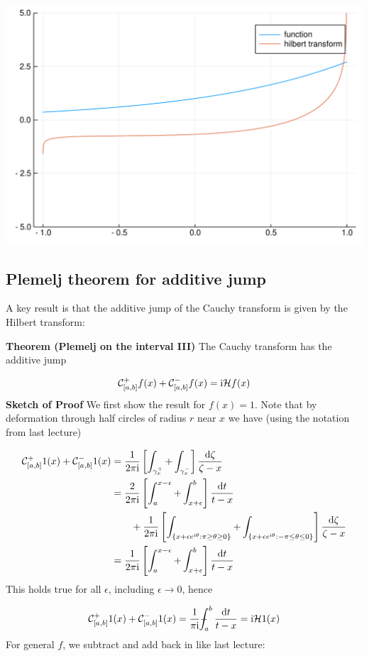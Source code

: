 \documentclass[12pt,a4paper]{article}
\def\D{ {\rm d} }
\def\I{ {\rm i} }
\def\CC{ {\cal C} }
\def\HH{ {\cal H} }
\def\Xint#1{ \mathchoice
   {\XXint\displaystyle\textstyle{#1} }%
   {\XXint\textstyle\scriptstyle{#1} }%
   {\XXint\scriptstyle\scriptscriptstyle{#1} }%
   {\XXint\scriptscriptstyle\scriptscriptstyle{#1} }%
   \!\int}
\def\XXint#1#2#3{ {\setbox0=\hbox{$#1{#2#3}{\int}$}
     \vcenter{\hbox{$#2#3$}}\kern-.5\wd0} }
\def\dashint{\Xint-}
\def\dt{\D t}
\begin{document}
\includegraphics[width=\linewidth]{figures/Lecture14_4_1.pdf}

\subsection{Plemelj theorem for additive jump}
A key result is that the additive jump of the Cauchy transform is given by the Hilbert transform:

\textbf{Theorem (Plemelj on the interval III)}  The Cauchy transform has the additive jump

\[
\CC_{[a,b]}^+ f(x) + \CC_{[a,b]}^- f(x) = \I \HH f(x)
\]
\textbf{Sketch of Proof} We first show the result for $f(x) = 1$. Note that by deformation through half circles of radius $r$ near $x$ we have (using the notation from last lecture)


\begin{align*}
\CC_{[a,b]}^+ 1(x) + \CC_{[a,b]}^- 1(x) &= {1 \over 2 \pi\I} \left[\int_{\gamma_x^+} + \int_{\gamma_x^-} \right] {\D \zeta \over \zeta -x}  \\
        & = {2 \over 2 \pi \I} \left[ \int_a^{x-\epsilon} + \int_{x+\epsilon}^b \right] {\dt \over t - x} \cr
        & \qquad + {1 \over 2 \pi \I} \left[ \int_{\{x + \epsilon e^{\I \theta} : \pi \geq \theta \geq 0 \}} + \int_{\{x + \epsilon e^{\I \theta} : -\pi \leq \theta \leq 0 \}} \right] {\D\zeta \over \zeta - x} \\
&= {1 \over 2 \pi \I} \left[ \int_a^{x-\epsilon} + \int_{x+\epsilon}^b \right] {\dt \over t - x} 
\end{align*}
This holds true for all $\epsilon$, including $\epsilon \rightarrow 0$, hence

\[
\CC_{[a,b]}^+ 1(x) + \CC_{[a,b]}^- 1(x) = {1 \over \pi \I} \dashint_a^b {\dt \over t -x} = \I \HH 1(x)
\]
For general $f$, we subtract and add back in like last lecture:
\end{document}
